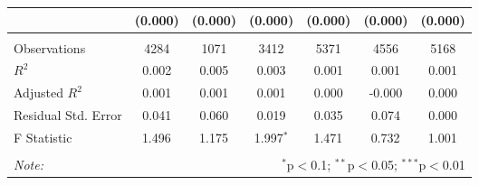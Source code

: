 \begin{table}[!htbp]
\begin{tabular}{@{\extracolsep{5pt}}lcccccc}
& (0.000) & (0.000) & (0.000) & (0.000) & (0.000) & (0.000) \\
\hline \\[-1.8ex]
 Observations & 4284 & 1071 & 3412 & 5371 & 4556 & 5168 \\
 $R^2$ & 0.002 & 0.005 & 0.003 & 0.001 & 0.001 & 0.001 \\
 Adjusted $R^2$ & 0.001 & 0.001 & 0.001 & 0.000 & -0.000 & 0.000 \\
 Residual Std. Error & 0.041 & 0.060 & 0.019 & 0.035 & 0.074 & 0.000 \\
 F Statistic & 1.496$^{}$ & 1.175$^{}$ & 1.997$^{*}$ & 1.471$^{}$ & 0.732$^{}$ & 1.001$^{}$ \\
\hline
\hline \\[-1.8ex]
\textit{Note:} & \multicolumn{6}{r}{$^{*}$p$<$0.1; $^{**}$p$<$0.05; $^{***}$p$<$0.01} \\
\end{tabular}
\end{table}